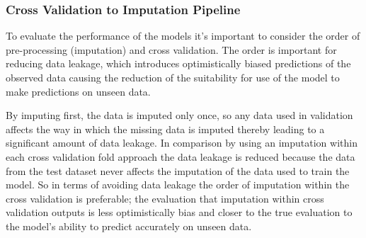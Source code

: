 \documentclass[11pt]{article}
\begin{document}
\subsubsection{Cross Validation to Imputation Pipeline}
To evaluate the performance of the models it's important to consider the order of pre-processing (imputation) and cross validation. The order is important for reducing data leakage\cite{Dataleakage}, which introduces optimistically biased predictions of the observed data causing the reduction of the suitability for use of the model to make predictions on unseen data.

By imputing first, the data is imputed only once, so any data used in validation affects the way in which the missing data is imputed thereby leading to a significant amount of data leakage. In comparison by using an imputation within each cross validation fold approach the data leakage is reduced because the data from the test dataset never affects the imputation of the data used to train the model. So in terms of avoiding data leakage the order of imputation within the cross validation is preferable; the evaluation that imputation within cross validation outputs is less optimistically bias and closer to the true evaluation to the model's ability to predict accurately on unseen data. 

\end{document}

